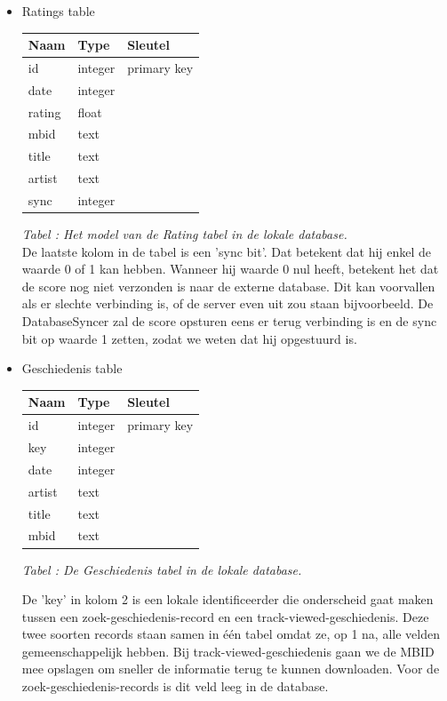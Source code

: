 \documentclass[11pt,a4paper]{article}
\newcounter{tabc}
\newcommand{\tabID} {%
   \stepcounter{tabc}%
   \thetabc}
\begin{document}
	 \begin{itemize}
		\item Ratings table \newline
		\begin{tabular}{| l | l | l | }
		\hline
		 Naam		& Type		& Sleutel		\\
		 \hline 
		id 		& integer 	& primary key 	\\
		date 	& integer	& 				\\
		rating 	& float 	& 				\\
		mbid 	& text 		& 				\\
		title 	& text 		& 				\\
		artist 	& text 		& 				\\
		sync	& integer 	& 				\\
		\hline
		\end{tabular} \newline
		\small \textit{Tabel \tabID : Het model van de Rating tabel in de lokale database.} \\ \normalsize \newline
		De laatste kolom in de tabel is een 'sync bit'. Dat betekent dat hij enkel de waarde 0 of 1 kan hebben. Wanneer hij waarde 0 nul heeft, betekent het dat de score nog niet verzonden is naar de externe database. Dit kan voorvallen als er slechte verbinding is, of de server even uit zou staan bijvoorbeeld.  De DatabaseSyncer zal de score opsturen eens er terug verbinding is en de sync bit op waarde 1 zetten, zodat we weten dat hij opgestuurd is. %
		
		\item Geschiedenis table \newline
		\begin{tabular}{| l | l | l | }
		\hline
		Naam	& Type		& Sleutel		\\
		\hline
		id 		& integer 	& primary key 	\\
		key		& integer	&				\\
		date 	& integer 	& 				\\
		artist 	& text 		& 				\\
		title 	& text 		& 				\\
		mbid 	& text 		& 				\\
		\hline
		\end{tabular} \newline
		\small \textit{Tabel \tabID : De Geschiedenis tabel in de lokale database.} \\ \normalsize
	
		De 'key' in kolom 2 is een lokale identificeerder die onderscheid gaat maken tussen een zoek-geschiedenis-record en een track-viewed-geschiedenis. Deze twee soorten records staan samen in één tabel omdat ze, op 1 na, alle velden gemeenschappelijk hebben. Bij track-viewed-geschiedenis gaan we de MBID mee opslagen om sneller de informatie terug te kunnen downloaden. Voor de zoek-geschiedenis-records is dit veld leeg in de database.
	 \end{itemize}
	
\end{document}
